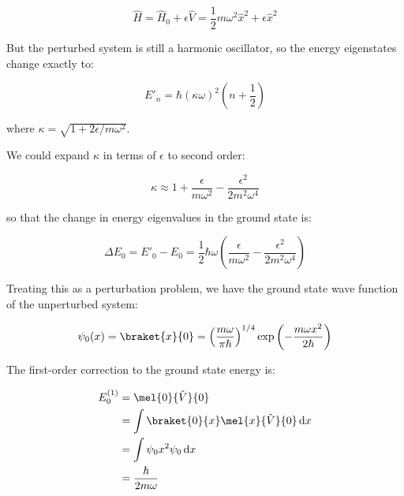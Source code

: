 \documentclass[12pt]{article}
\begin{document}
\begin{equation}
    \hat{H} = \hat{H}_{0} + \epsilon \hat{V} = \frac{1}{2} m \omega^{2} \hat{x}^{2} + \epsilon \hat{x}^{2}
\end{equation}

But the perturbed system is still a harmonic oscillator, so the energy eigenstates change exactly to:

\begin{equation}
    E'_{n} = \hbar (\kappa \omega)^{2} \left( n + \frac{1}{2} \right)
\end{equation}

where $\kappa = \sqrt{1 + 2\epsilon/m\omega^{2}}$.

We could expand $\kappa$ in terms of $\epsilon$ to second order:

\begin{equation}
    \kappa \approx 1 + \frac{\epsilon}{m\omega^{2}} - \frac{\epsilon^{2}}{2m^{2}\omega^{4}}
\end{equation}

so that the change in energy eigenvalues in the ground state is:

\begin{equation}
    \Delta E_{0} = E'_{0} - E_{0} = \frac{1}{2} \hbar \omega \left( \frac{\epsilon}{m\omega^{2}} - \frac{\epsilon^{2}}{2m^{2}\omega^{4}} \right)
\end{equation}

Treating this as a perturbation problem, we have the ground state wave function of the unperturbed system:

\begin{equation}
    \psi_{0}(x) = \braket{x}{0} = \left( \frac{m\omega}{\pi\hbar} \right)^{1/4} \exp \left( -\frac{m\omega x^{2}}{2\hbar} \right)
\end{equation}

The first-order correction to the ground state energy is:

\begin{equation}
    \begin{split}
        E_{0}^{(1)} &= \mel{0}{\hat{V}}{0} \\
        &= \int \braket{0}{x} \mel{x}{\hat{V}}{0} \, \mathrm{d}x \\
        &= \int \psi_{0} x^{2} \psi_{0} \, \mathrm{d}x \\
        &= \frac{\hbar}{2m\omega}
    \end{split}
\end{equation}
\end{document}
